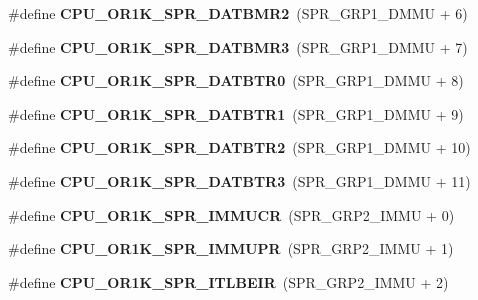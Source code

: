 \begin{DoxyCompactItemize}
\#define {\bfseries C\+P\+U\+\_\+\+O\+R1\+K\+\_\+\+S\+P\+R\+\_\+\+D\+A\+T\+B\+M\+R2}~(S\+P\+R\+\_\+\+G\+R\+P1\+\_\+\+D\+M\+MU + 6)
\item 
\mbox{\label{or1k-utility_8h_ac8f4fa3a77eb9e612ed2571b333946b5}} 
\#define {\bfseries C\+P\+U\+\_\+\+O\+R1\+K\+\_\+\+S\+P\+R\+\_\+\+D\+A\+T\+B\+M\+R3}~(S\+P\+R\+\_\+\+G\+R\+P1\+\_\+\+D\+M\+MU + 7)
\item 
\mbox{\label{or1k-utility_8h_a88e8880a694685be39b3eed94c87dfb9}} 
\#define {\bfseries C\+P\+U\+\_\+\+O\+R1\+K\+\_\+\+S\+P\+R\+\_\+\+D\+A\+T\+B\+T\+R0}~(S\+P\+R\+\_\+\+G\+R\+P1\+\_\+\+D\+M\+MU + 8)
\item 
\mbox{\label{or1k-utility_8h_ac5a89aff5f08c8907955d6c3d9df43f5}} 
\#define {\bfseries C\+P\+U\+\_\+\+O\+R1\+K\+\_\+\+S\+P\+R\+\_\+\+D\+A\+T\+B\+T\+R1}~(S\+P\+R\+\_\+\+G\+R\+P1\+\_\+\+D\+M\+MU + 9)
\item 
\mbox{\label{or1k-utility_8h_aae26bbd7c5410486fb96df97d2d32180}} 
\#define {\bfseries C\+P\+U\+\_\+\+O\+R1\+K\+\_\+\+S\+P\+R\+\_\+\+D\+A\+T\+B\+T\+R2}~(S\+P\+R\+\_\+\+G\+R\+P1\+\_\+\+D\+M\+MU + 10)
\item 
\mbox{\label{or1k-utility_8h_ae0b5398ebbaccacd93d34700f17801dd}} 
\#define {\bfseries C\+P\+U\+\_\+\+O\+R1\+K\+\_\+\+S\+P\+R\+\_\+\+D\+A\+T\+B\+T\+R3}~(S\+P\+R\+\_\+\+G\+R\+P1\+\_\+\+D\+M\+MU + 11)
\item 
\mbox{\label{or1k-utility_8h_ac07bfd696c056a2ac929364963047eb3}} 
\#define {\bfseries C\+P\+U\+\_\+\+O\+R1\+K\+\_\+\+S\+P\+R\+\_\+\+I\+M\+M\+U\+CR}~(S\+P\+R\+\_\+\+G\+R\+P2\+\_\+\+I\+M\+MU + 0)
\item 
\mbox{\label{or1k-utility_8h_a2c74f6efba1cf9e6858a49730850397f}} 
\#define {\bfseries C\+P\+U\+\_\+\+O\+R1\+K\+\_\+\+S\+P\+R\+\_\+\+I\+M\+M\+U\+PR}~(S\+P\+R\+\_\+\+G\+R\+P2\+\_\+\+I\+M\+MU + 1)
\item 
\mbox{\label{or1k-utility_8h_aaab1c1b73572c7487ed8d936822e95ae}} 
\#define {\bfseries C\+P\+U\+\_\+\+O\+R1\+K\+\_\+\+S\+P\+R\+\_\+\+I\+T\+L\+B\+E\+IR}~(S\+P\+R\+\_\+\+G\+R\+P2\+\_\+\+I\+M\+MU + 2)
\item 

\end{DoxyCompactItemize}
